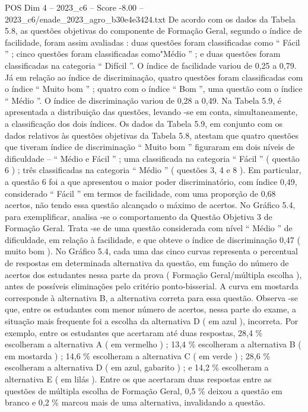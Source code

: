 \begin{textsample}{POS Dim 4 – 2023\_c6 – Score -8.00 – 2023\_c6/enade\_2023\_agro\_b30e4e3424.txt}
De acordo com os dados da Tabela 5.8, as questões objetivas do componente de Formação Geral, segundo o índice de facilidade, foram assim avaliadas : duas questões foram classificadas como “ Fácil ” ; cinco questões foram classificadas como"Médio ” ; e duas questões foram classificadas na categoria “ Difícil ”.
O índice de facilidade variou de 0,25 a 0,79.
Já em relação ao índice de discriminação, quatro questões foram classificadas com o índice “ Muito bom ” ; quatro com o índice “ Bom ”, uma questão com o índice “ Médio ”.
O índice de discriminação variou de 0,28 a 0,49.
Na Tabela 5.9, é apresentada a distribuição das questões, levando -se em conta, simultaneamente, a classificação dos dois índices.
Os dados da Tabela 5.9, em conjunto com os dados relativos às questões objetivas da Tabela 5.8, atestam que quatro questões que tiveram índice de discriminação “ Muito bom ” figuraram em dois níveis de dificuldade – “ Médio e Fácil ” ; uma classificada na categoria “ Fácil ” ( questão 6 ) ; três classificadas na categoria “ Médio ” ( questões 3, 4 e 8 ).
Em particular, a questão 6 foi a que apresentou o maior poder discriminatório, com índice 0,49, considerado “ Fácil ” em termos de facilidade, com uma proporção de 0,68 acertos, não tendo essa questão alcançado o máximo de acertos.
No Gráfico 5.4, para exemplificar, analisa -se o comportamento da Questão Objetiva 3 de Formação Geral.
Trata -se de uma questão considerada com nível “ Médio ” de dificuldade, em relação à facilidade, e que obteve o índice de discriminação 0,47 ( muito bom ).
No Gráfico 5.4, cada uma das cinco curvas representa o percentual de respostas em determinada alternativa da questão, em função do número de acertos dos estudantes nessa parte da prova ( Formação Geral/múltipla escolha ), antes de possíveis eliminações pelo critério ponto-bisserial.
A curva em mostarda corresponde à alternativa B, a alternativa correta para essa questão.
Observa -se que, entre os estudantes com menor número de acertos, nessa parte do exame, a situação mais frequente foi a escolha da alternativa D ( em azul ), incorreta.
Por exemplo, entre os estudantes que acertaram até duas respostas, 28,4 \% escolheram a alternativa A ( em vermelho ) ; 13,4 \% escolheram a alternativa B ( em mostarda ) ; 14,6 \% escolheram a alternativa C ( em verde ) ; 28,6 \% escolheram a alternativa D ( em azul, gabarito ) ; e 14,2 \% escolheram a alternativa E ( em lilás ).
Entre os que acertaram duas respostas entre as questões de múltipla escolha de Formação Geral, 0,5 \% deixou a questão em branco e 0,2 \% marcou mais de uma alternativa, invalidando a questão.

\end{textsample}
